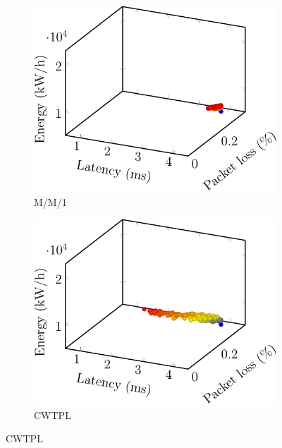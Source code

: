 \begin{figure}[t!]
    \begin{subfigure}[b]{0.48\linewidth}
        \includegraphics[width=\textwidth]{graphs/model/mm1-crop}
        \caption{M/M/1}
    \end{subfigure}
    \begin{subfigure}[b]{0.48\linewidth}
        \includegraphics[width=\textwidth]{graphs/model/constant_energy-crop}
        \caption{CWTPL}
    \end{subfigure}

    \vspace{1em}


\end{figure}
